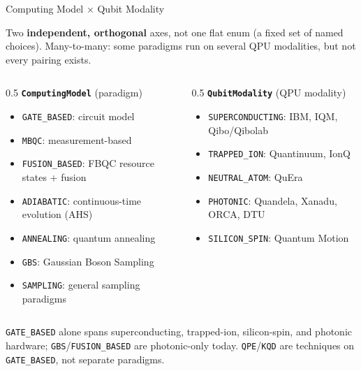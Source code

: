 \documentclass[
  ignorenonframetext,
  aspectratio=169,
]{beamer}
\providecommand{\tightlist}{%
  \setlength{\itemsep}{0pt}\setlength{\parskip}{0pt}}
\begin{document}
\begin{frame}[fragile]{Computing Model × Qubit Modality}
\label{computing-model-qubit-modality}
\scriptsize

Two \textbf{independent, orthogonal} axes, not one flat enum (a fixed
set of named choices). Many-to-many: some paradigms run on several QPU
modalities, but not every pairing exists.

\begin{columns}[T]
\begin{column}{0.5\textwidth}
\textbf{\texttt{ComputingModel}} (paradigm)

\begin{itemize}
\tightlist
\item
  \texttt{GATE\_BASED}: circuit model
\item
  \texttt{MBQC}: measurement-based
\item
  \texttt{FUSION\_BASED}: FBQC resource states + fusion
\item
  \texttt{ADIABATIC}: continuous-time evolution (AHS)
\item
  \texttt{ANNEALING}: quantum annealing
\item
  \texttt{GBS}: Gaussian Boson Sampling
\item
  \texttt{SAMPLING}: general sampling paradigms
\end{itemize}
\end{column}

\begin{column}{0.5\textwidth}
\textbf{\texttt{QubitModality}} (QPU modality)

\begin{itemize}
\tightlist
\item
  \texttt{SUPERCONDUCTING}: IBM, IQM, Qibo/Qibolab
\item
  \texttt{TRAPPED\_ION}: Quantinuum, IonQ
\item
  \texttt{NEUTRAL\_ATOM}: QuEra
\item
  \texttt{PHOTONIC}: Quandela, Xanadu, ORCA, DTU
\item
  \texttt{SILICON\_SPIN}: Quantum Motion
\end{itemize}
\end{column}
\end{columns}

\texttt{GATE\_BASED} alone spans superconducting, trapped-ion,
silicon-spin, and photonic hardware; \texttt{GBS}/\texttt{FUSION\_BASED}
are photonic-only today. \texttt{QPE}/\texttt{KQD} are techniques on
\texttt{GATE\_BASED}, not separate paradigms. \normalsize
\end{frame}
\end{document}
